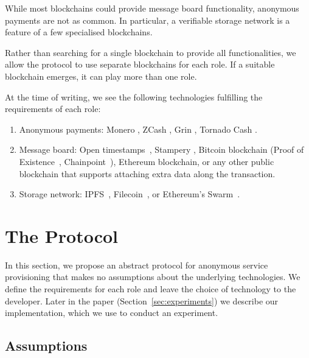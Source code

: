 \documentclass[pdftex,twocolumn,epjc3]{svjour3}
\begin{document}
{While most blockchains could provide message board functionality, anonymous payments are not as common. In particular, a verifiable storage network is a feature of a few specialised blockchains.

Rather than searching for a single blockchain to provide all functionalities, we allow the protocol to use separate blockchains for each role. If a suitable blockchain emerges, it can play more than one role.

At the time of writing, we see the following technologies fulfilling the requirements of each role:

\begin{enumerate}
\def\labelenumi{\arabic{enumi}.}

\item Anonymous payments: Monero \cite{vansaberhagenCryptoNote2013}, ZCash
  \cite{ben-sassonZerocashDecentralizedAnonymous2014}, Grin \cite{fuchsbauerAggregateCashSystems2019},
  Tornado Cash \cite{pertsevTornadoCashPrivacy2019}.
\item Message board: Open timestamps~\cite{opentimestampsTimestampingProofStandard}, Stampery \cite{crespoStamperyBlockchainTimestamping2017}, Bitcoin blockchain (Proof of Existence~\cite{proofofexistenceWebApplicationProve}, Chainpoint~\cite{chainpointBlockchainProofAnchoring}), Ethereum blockchain, or any other public blockchain that supports attaching extra data along the transaction.
\item Storage network: IPFS~\cite{benetIPFSContentAddressed2014}, Filecoin~\cite{protocollabsFilecoinDecentralizedStorage2017}, or Ethereum's
  Swarm~\cite{teamSWARMStorageCommunication2021}.
\end{enumerate}

\section{The Protocol}\label{sec:protocol}
In this section, we propose an abstract protocol for anonymous service provisioning that makes no assumptions about the underlying technologies. We define the requirements for each role and leave the choice of technology to the developer. Later in the paper (Section~\ref{sec:experiments}) we describe our implementation, which we use to conduct an experiment.

\subsection{Assumptions}

}
\end{document}
